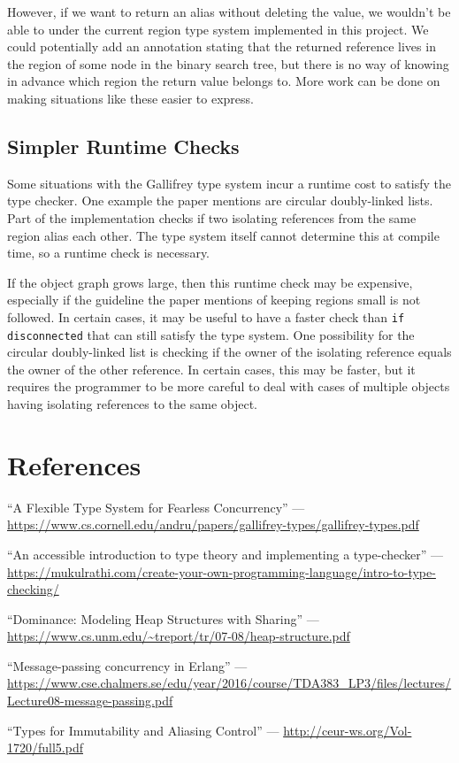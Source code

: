 \documentclass{article}
\begin{document}
  However,
    if we want to return an alias without deleting the value,
    we wouldn't be able to under the current region type system implemented in this project.
  We could potentially add an annotation stating that the returned reference
    lives in the region of some node in the binary search tree,
    but there is no way of knowing in advance which region the return value belongs to.
  More work can be done on making situations like these easier to express.

  \subsection{Simpler Runtime Checks}

  Some situations with the Gallifrey type system incur a runtime cost
    to satisfy the type checker.
  One example the paper mentions are circular doubly-linked lists.
  Part of the implementation checks if two isolating references from the same region
    alias each other.
  The type system itself cannot determine this at compile time,
    so a runtime check is necessary.

  If the object graph grows large,
    then this runtime check may be expensive,
    especially if the guideline the paper mentions
    of keeping regions small is not followed.
  In certain cases,
    it may be useful to have a faster check than \verb+if disconnected+
    that can still satisfy the type system.
  One possibility for the circular doubly-linked list is checking
    if the owner of the isolating reference equals the owner of the other reference.
  In certain cases,
    this may be faster,
    but it requires the programmer to be more careful
    to deal with cases of multiple objects having isolating references to the same object.

  \section{References}

  ``A Flexible Type System for Fearless Concurrency'' ---
  \url{https://www.cs.cornell.edu/andru/papers/gallifrey-types/gallifrey-types.pdf}

  ``An accessible introduction to type theory and implementing a type-checker'' ---
  \url{https://mukulrathi.com/create-your-own-programming-language/intro-to-type-checking/}

  ``Dominance: Modeling Heap Structures with Sharing'' ---
  \url{https://www.cs.unm.edu/~treport/tr/07-08/heap-structure.pdf}

  ``Message-passing concurrency in Erlang'' ---
  \url{https://www.cse.chalmers.se/edu/year/2016/course/TDA383_LP3/files/lectures/Lecture08-message-passing.pdf}

 ``Types for Immutability and Aliasing Control'' ---
 \url{http://ceur-ws.org/Vol-1720/full5.pdf}
\end{document}
